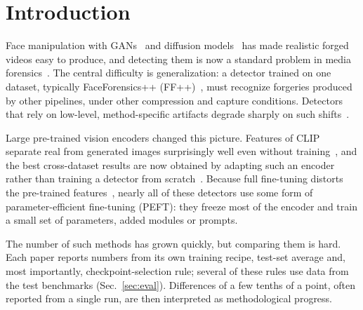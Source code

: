 \documentclass[fonts]{icst}
\begin{document}
\maketitle

\section{Introduction}

Face manipulation with GANs~\cite{goodfellow2020gan} and diffusion models~\cite{yang2022diffusion} has made realistic forged videos easy to produce, and detecting them is now a standard problem in media forensics~\cite{pei2024survey,liu2024evolving}. The central difficulty is generalization: a detector trained on one dataset, typically FaceForensics++ (FF++)~\cite{rossler2019ff}, must recognize forgeries produced by other pipelines, under other compression and capture conditions. Detectors that rely on low-level, method-specific artifacts degrade sharply on such shifts~\cite{qian2020frequency,luo2021srm,yan2023deepfakebench}.

Large pre-trained vision encoders changed this picture. Features of CLIP~\cite{radford2021clip_vitl} separate real from generated images surprisingly well even without training~\cite{ojha2023universal,tsai2024trainingfree}, and the best cross-dataset results are now obtained by adapting such an encoder rather than training a detector from scratch~\cite{yan2025effort,yermakov2025gend,cui2025forada}. Because full fine-tuning distorts the pre-trained features~\cite{kumar2022finetuning}, nearly all of these detectors use some form of parameter-efficient fine-tuning (PEFT): they freeze most of the encoder and train a small set of parameters, added modules or prompts.

The number of such methods has grown quickly, but comparing them is hard. Each paper reports numbers from its own training recipe, test-set average and, most importantly, checkpoint-selection rule; several of these rules use data from the test benchmarks (Sec.~\ref{sec:eval}). Differences of a few tenths of a point, often reported from a single run, are then interpreted as methodological progress.
\end{document}
